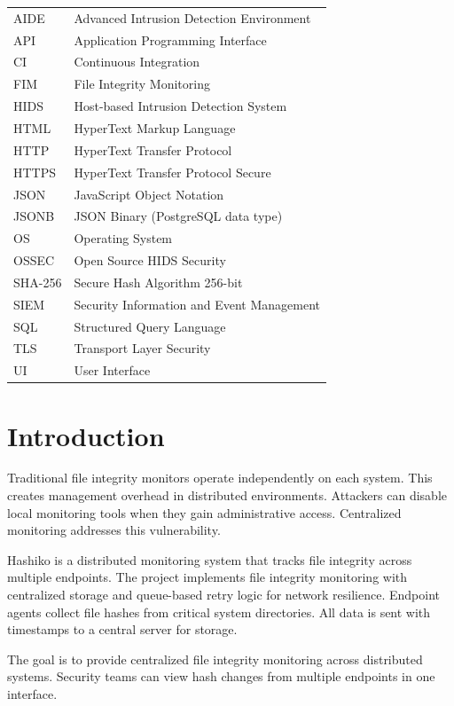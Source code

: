 \documentclass[conference]{IEEEtran}
\begin{document}
\begin{tabularx}{\columnwidth}{@{}p{1.2cm}X@{}}
AIDE  & Advanced Intrusion Detection Environment \\
API   & Application Programming Interface \\
CI    & Continuous Integration \\
FIM   & File Integrity Monitoring \\
HIDS  & Host-based Intrusion Detection System \\
HTML  & HyperText Markup Language \\
HTTP  & HyperText Transfer Protocol \\
HTTPS & HyperText Transfer Protocol Secure \\
JSON  & JavaScript Object Notation \\
JSONB & JSON Binary (PostgreSQL data type) \\
OS    & Operating System \\
OSSEC & Open Source HIDS Security \\
SHA-256 & Secure Hash Algorithm 256-bit \\
SIEM  & Security Information and Event Management \\
SQL   & Structured Query Language \\
TLS   & Transport Layer Security \\
UI    & User Interface \\
\end{tabularx}

\section{Introduction}

Traditional file integrity monitors operate independently on each system. This creates management overhead in distributed environments. Attackers can disable local monitoring tools when they gain administrative access. Centralized monitoring addresses this vulnerability.

Hashiko is a distributed monitoring system that tracks file integrity across multiple endpoints. The project implements file integrity monitoring with centralized storage and queue-based retry logic for network resilience. Endpoint agents collect file hashes from critical system directories. All data is sent with timestamps to a central server for storage.

The goal is to provide centralized file integrity monitoring across distributed systems. Security teams can view hash changes from multiple endpoints in one interface.
\end{document}
